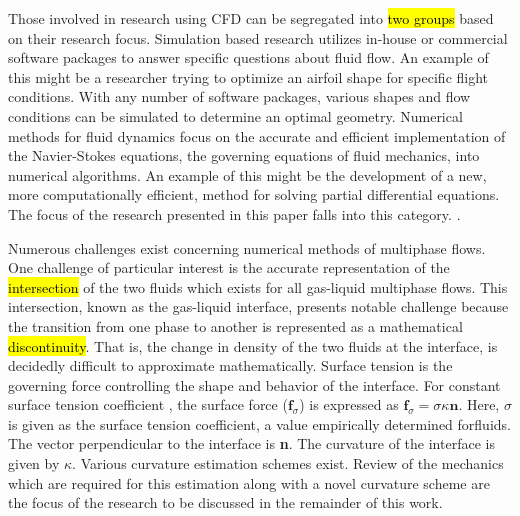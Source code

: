 Those involved in research using CFD can be segregated into \hl{two groups} based on their research focus. Simulation based research utilizes in-house or commercial software packages to answer specific questions about fluid flow. An example of this might be a researcher trying to optimize an airfoil shape for specific flight conditions. With any number of software packages, various shapes and flow conditions can be simulated to determine an optimal geometry. Numerical methods for fluid dynamics focus on the accurate and efficient implementation of the Navier-Stokes equations, the governing equations of fluid mechanics, into numerical algorithms. An example of this might be the development of a new, more computationally efficient, method for solving partial differential equations. The focus of the research presented in this paper falls into this category.
.

Numerous challenges exist concerning numerical methods of multiphase flows. One challenge of particular interest is the accurate representation of the \hl{intersection} of the two fluids which exists for all gas-liquid multiphase flows. This intersection, known as the gas-liquid interface, presents notable challenge because the transition from one phase to another is represented as a mathematical \hl{discontinuity}. That is, the change in density of the two fluids at the interface, is decidedly difficult to approximate mathematically. Surface tension is the governing force controlling the shape and behavior of the interface. For constant surface tension coefficient , the surface force ($\textbf{f}_{\sigma}$) is expressed as $\textbf{f}_{\sigma} = \sigma \kappa \textbf{n}$\cite{desjardins_direct_2013}. Here, $\sigma$ is given as the surface tension coefficient, a value empirically determined forfluids. The vector perpendicular to the interface is \textbf{n}. The curvature of the interface is given by $\kappa$. Various curvature estimation schemes exist. Review of the mechanics which are required for this estimation along with a novel curvature scheme are the focus of the research to be discussed in the remainder of this work.

